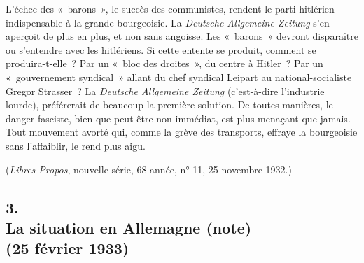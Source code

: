 \documentclass[french,twoside]{book} %
\begin{document}
L'échec des « barons », le succès des communistes, rendent le parti hitlé­rien indispensable à la grande bourgeoisie. La {\itshape Deutsche Allgemeine Zeitung} s'en aperçoit de plus en plus, et non sans angoisse. Les « barons » devront disparaître ou s'entendre avec les hitlériens. Si cette entente se produit, comment se produira-t-elle ? Par un « bloc des droites », du centre à Hitler ? Par un « gouvernement syndical » allant du chef syndical Leipart au national-socialiste Gregor Strasser ? La {\itshape Deutsche Allgemeine Zeitung} (c'est-à-dire l'industrie lourde), préférerait de beaucoup la première solution. De toutes manières, le danger fasciste, bien que peut-être non immédiat, est plus mena­çant que jamais. Tout mouvement avorté qui, comme la grève des transports, effraye la bourgeoisie sans l'affaiblir, le rend plus aigu.\par
({\itshape Libres Propos}, nouvelle série, 68 année, n° 11, 25 novembre 1932.)\par

\begin{center}
\noindent \centerline{}
\end{center}

\subsection[{3. La situation en Allemagne (note) (25 février 1933)}]{3. \\
La situation en Allemagne (note) \\
(25 février 1933)}
\noindent \par
\end{document}
